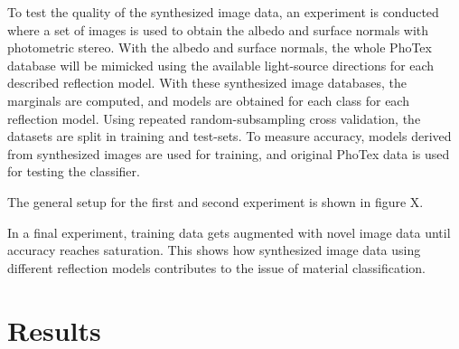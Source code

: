 To test the quality of the synthesized image data, an experiment is conducted where a set of images is used to obtain the albedo and surface normals with photometric stereo. With the albedo and surface normals, the whole PhoTex database will be mimicked using the available light-source directions for each described reflection model. With these synthesized image databases, the marginals are computed, and models are obtained for each class for each reflection model. Using repeated random-subsampling cross validation, the datasets are split in training and test-sets. To measure accuracy, models derived from synthesized images are used for training, and original PhoTex data is used for testing the classifier. 

The general setup for the first and second experiment is shown in figure X.

In a final experiment, training data gets augmented with novel image data until accuracy reaches saturation. This shows how synthesized image data using different reflection models contributes to the issue of material classification.

\section{Results}\label{sec:Results}

